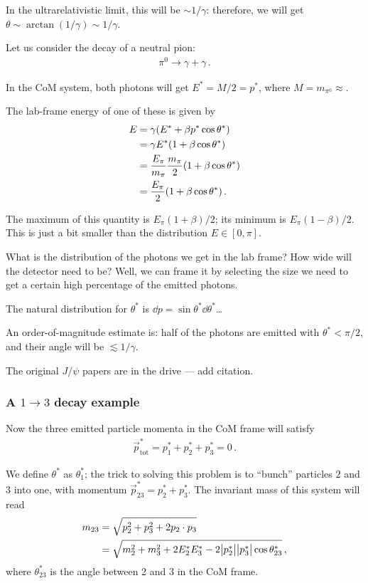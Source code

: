 \documentclass[main.tex]{subfiles}
\begin{document}
In the ultrarelativistic limit, this will be \(\sim 1/ \gamma \): therefore, we will get \(\theta \sim \arctan (1 / \gamma ) \sim 1/ \gamma \).

Let us consider the decay of a neutral pion: 
%
\begin{align}
\pi^{0} \to \gamma + \gamma 
\,.
\end{align}

In the CoM system, both photons will get \(E^{*} = M/2 = p^{*}\), where \(M = m_{\pi^{0}} \approx \).

The lab-frame energy of one of these is given by 
%
\begin{align}
E &= \gamma \qty(E^{*} + \beta p^{*} \cos \theta^{*})\\
 &= \gamma E^{*} ( 1 + \beta \cos \theta^{*})  \\
 &= \frac{E_\pi }{m_\pi } \frac{m_\pi}{2} \qty(1 + \beta \cos \theta^{*})  \\
 &= \frac{E_\pi }{2} \qty(1 + \beta \cos \theta^{*})
\,.
\end{align}

The maximum of this quantity is \(E_\pi (1 + \beta ) /2\); its minimum is \(E_\pi (1 - \beta ) / 2\). 
This is just a bit smaller than the distribution \(E \in [0, \pi ]\). 

What is the distribution of the photons we get in the lab frame? How wide will the detector need to be? 
Well, we can frame it by selecting the size we need to get a certain high percentage of the emitted photons. 

The natural distribution for \(\theta^{*}\) is 
\(\dd{p} = \sin \theta^{*} \dd{\theta^{*}}\)\dots 

An order-of-magnitude estimate is: half of the photons are emitted with \(\theta^{*} < \pi /2\), and their angle will be \(\lesssim 1 / \gamma \).

The original \(J/\psi \) papers are in the drive --- add citation.

\subsubsection{A \(1 \to 3\) decay example}

Now the three emitted particle momenta in the CoM frame will satisfy 
%
\begin{align}
\vec{p}^{*} _{\text{tot}} = 
p^{*}_{1} + 
p^{*}_{2} + 
p^{*}_{3} = 0
\,.
\end{align}

We define \(\theta^{*}\) as \(\theta^{*}_1\); the trick to solving this problem is to ``bunch'' particles \(2\) and \(3\) into one, with momentum \(\vec{p}^{*}_{23} = p^{*}_{2} + p^{*}_{3}\). 
The invariant mass of this system will read 
%
\begin{align}
m_{\text{23}} &= \sqrt{p_2^2 + p_3^2 + 2 p_2 \cdot p_3}  \\
&= \sqrt{m_2^2 + m_3^2 + 2 E_2^{*} E_3^{*} - 2 \abs{p_2^{*}} \abs{p_3^{*}} \cos \theta^{*}_{23}}
\,,
\end{align}
%
where \(\theta^{*}_{23}\) is the angle between 2 and 3 in the CoM frame. 
\end{document}
